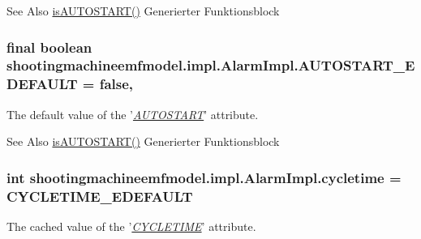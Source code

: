 \begin{DoxySeeAlso}{See Also}
\hyperlink{classshootingmachineemfmodel_1_1impl_1_1_alarm_impl_abf52c0d2ad03e0367f3f315a4683c14f}{is\-A\-U\-T\-O\-S\-T\-A\-R\-T()} Generierter Funktionsblock  
\end{DoxySeeAlso}
\hypertarget{classshootingmachineemfmodel_1_1impl_1_1_alarm_impl_ae3645bdaa1939ee466b393bec08d2ad3}{
\subsubsection[{A\-U\-T\-O\-S\-T\-A\-R\-T\-\_\-\-E\-D\-E\-F\-A\-U\-L\-T}]{\setlength{\rightskip}{0pt plus 5cm}final boolean shootingmachineemfmodel.\-impl.\-Alarm\-Impl.\-A\-U\-T\-O\-S\-T\-A\-R\-T\-\_\-\-E\-D\-E\-F\-A\-U\-L\-T = false\hspace{0.3cm}{\ttfamily [static]}, {\ttfamily [protected]}}}\label{classshootingmachineemfmodel_1_1impl_1_1_alarm_impl_ae3645bdaa1939ee466b393bec08d2ad3}
The default value of the '\hyperlink{classshootingmachineemfmodel_1_1impl_1_1_alarm_impl_abf52c0d2ad03e0367f3f315a4683c14f}{{\itshape A\-U\-T\-O\-S\-T\-A\-R\-T}}' attribute.

\begin{DoxySeeAlso}{See Also}
\hyperlink{classshootingmachineemfmodel_1_1impl_1_1_alarm_impl_abf52c0d2ad03e0367f3f315a4683c14f}{is\-A\-U\-T\-O\-S\-T\-A\-R\-T()} Generierter Funktionsblock  
\end{DoxySeeAlso}
\hypertarget{classshootingmachineemfmodel_1_1impl_1_1_alarm_impl_a46d6e8977ebf62cb1750a0ae81d7cf1e}{
\subsubsection[{cycletime}]{\setlength{\rightskip}{0pt plus 5cm}int shootingmachineemfmodel.\-impl.\-Alarm\-Impl.\-cycletime = {\bf C\-Y\-C\-L\-E\-T\-I\-M\-E\-\_\-\-E\-D\-E\-F\-A\-U\-L\-T}\hspace{0.3cm}{\ttfamily [protected]}}}\label{classshootingmachineemfmodel_1_1impl_1_1_alarm_impl_a46d6e8977ebf62cb1750a0ae81d7cf1e}
The cached value of the '\hyperlink{classshootingmachineemfmodel_1_1impl_1_1_alarm_impl_a5bf352e51eec89bd76092fb853ddde24}{{\itshape C\-Y\-C\-L\-E\-T\-I\-M\-E}}' attribute.

